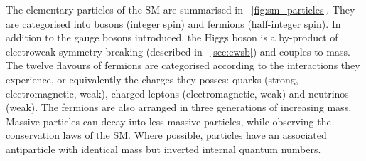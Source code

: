 The elementary particles of the \ac{SM} are summarised in \Figure~\ref{fig:sm_particles}.
They are categorised into bosons (integer spin) and fermions (half-integer spin).
In addition to the gauge bosons introduced, the Higgs boson is a by-product
of electroweak symmetry breaking (described in \Section~\ref{sec:ewsb}) and couples to 
mass. The twelve flavours of fermions are categorised according to the interactions they 
experience, or equivalently the charges they posses: quarks (strong, electromagnetic, 
weak), charged leptons (electromagnetic, weak) and neutrinos (weak). The fermions are also 
arranged in three generations of increasing mass. Massive particles can decay into less 
massive particles, while observing the conservation laws of the \ac{SM}. Where possible, 
particles have an associated antiparticle with identical mass but inverted internal 
quantum numbers.
